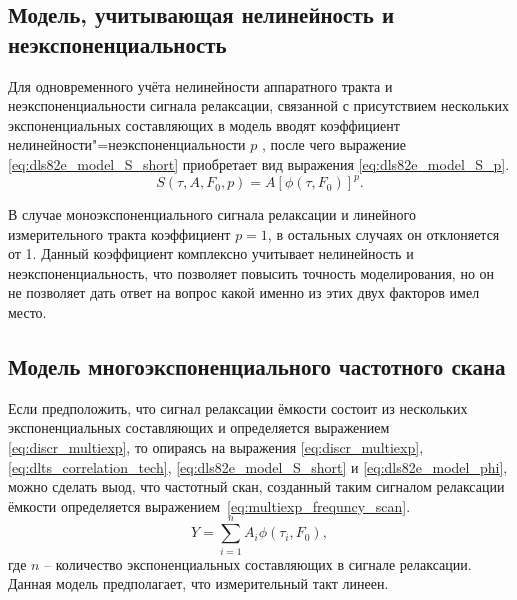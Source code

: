     \subsection{Модель, учитывающая нелинейность и неэкспоненциальность}

    Для одновременного учёта нелинейности аппаратного тракта и 
    неэкспоненциальности сигнала релаксации, связанной с присутствием 
    нескольких экспоненциальных составляющих в модель вводят коэффициент
    нелинейности"=неэкспоненциальности $p$ \cite{rp_vak}, после чего 
    выражение \ref{eq:dls82e_model_S_short} приобретает вид выражения 
    \ref{eq:dls82e_model_S_p}.
    \begin{equation}
        \label{eq:dls82e_model_S_p}
        S(\tau,A,F_0,p) = A\left[\phi(\tau, F_0)\right]^p.
    \end{equation}

    В случае моноэкспоненциального сигнала релаксации и линейного измерительного
    тракта коэффициент $p=1$, в остальных случаях он отклоняется от 1. Данный 
    коэффициент комплексно учитывает нелинейность и неэкспоненциальность, что
    позволяет повысить точность моделирования, но он не позволяет дать ответ 
    на вопрос какой именно из этих двух факторов имел место.


    \subsection{Модель многоэкспоненциального частотного скана}
    Если предположить, что сигнал релаксации ёмкости состоит из нескольких
    экспоненциальных составляющих и определяется выражением
    \ref{eq:discr_multiexp}, то опираясь на выражения
    \ref{eq:discr_multiexp}, \ref{eq:dlts_correlation_tech}, 
    \ref{eq:dls82e_model_S_short} и \ref{eq:dls82e_model_phi}, можно
    сделать выод, что частотный скан, созданный таким сигналом релаксации
    ёмкости определяется выражением~\ref{eq:multiexp_frequncy_scan}.
    \begin{equation}
        \label{eq:multiexp_frequncy_scan}
        Y = \sum_{i=1}^{n} A_i \phi(\tau_i, F_0) ,
    \end{equation}
    где $n$ -- количество экспоненциальных составляющих в сигнале 
    релаксации.
    Данная модель предполагает, что измерительный такт линеен.